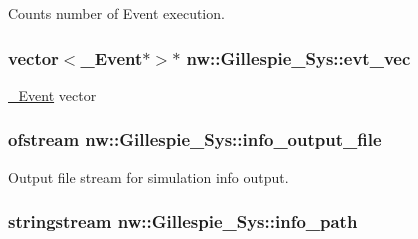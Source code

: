 Counts number of Event execution. 

\hypertarget{classnw_1_1_gillespie___sys_a3f9b4464bed7135f51413c57f086aef7}{
\subsubsection[{evt\+\_\+vec}]{\setlength{\rightskip}{0pt plus 5cm}vector$<${\bf \+\_\+\+Event}$\ast$$>$$\ast$ nw\+::\+Gillespie\+\_\+\+Sys\+::evt\+\_\+vec\hspace{0.3cm}{\ttfamily [private]}}}\label{classnw_1_1_gillespie___sys_a3f9b4464bed7135f51413c57f086aef7}


\hyperlink{classnw_1_1___event}{\+\_\+\+Event} vector 

\hypertarget{classnw_1_1_gillespie___sys_a1137e63fe12d34f81110bf5e8ebe856c}{
\subsubsection[{info\+\_\+output\+\_\+file}]{\setlength{\rightskip}{0pt plus 5cm}ofstream nw\+::\+Gillespie\+\_\+\+Sys\+::info\+\_\+output\+\_\+file\hspace{0.3cm}{\ttfamily [private]}}}\label{classnw_1_1_gillespie___sys_a1137e63fe12d34f81110bf5e8ebe856c}


Output file stream for simulation info output. 

\hypertarget{classnw_1_1_gillespie___sys_a24b051d05da3cc35a983536371522e2c}{
\subsubsection[{info\+\_\+path}]{\setlength{\rightskip}{0pt plus 5cm}stringstream nw\+::\+Gillespie\+\_\+\+Sys\+::info\+\_\+path\hspace{0.3cm}{\ttfamily [private]}}}\label{classnw_1_1_gillespie___sys_a24b051d05da3cc35a983536371522e2c}


